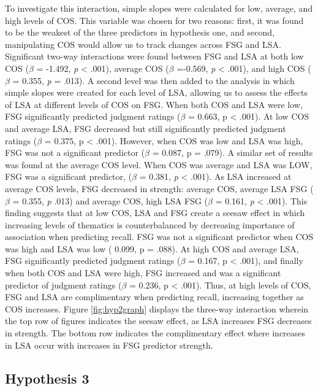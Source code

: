 \documentclass[english,man]{apa6}
\theoremstyle{definition}
\theoremstyle{definition}
\theoremstyle{definition}
\theoremstyle{remark}
\begin{document}
To investigate this interaction, simple slopes were calculated for low,
average, and high levels of COS. This variable was chosen for two
reasons: first, it was found to be the weakest of the three predictors
in hypothesis one, and second, manipulating COS would allow us to track
changes across FSG and LSA. Significant two-way interactions were found
between FSG and LSA at both low COS (\(\beta\) = -1.492, \emph{p}
\textless{} .001), average COS (\(\beta\) =-0.569, \emph{p} \textless{}
.001), and high COS (\(\beta\) = 0.355, \emph{p} = .013). A second level
was then added to the analysis in which simple slopes were created for
each level of LSA, allowing us to assess the effects of LSA at different
levels of COS on FSG. When both COS and LSA were low, FSG significantly
predicted judgment ratings (\(\beta\) = 0.663, p \textless{} .001). At
low COS and average LSA, FSG decreased but still significantly predicted
judgment ratings (\(\beta\) = 0.375, p \textless{} .001). However, when
COS was low and LSA was high, FSG was not a significant predictor
(\(\beta\) = 0.087, p = .079). A similar set of results was found at the
average COS level. When COS was average and LSA was LOW, FSG was a
significant predictor, (\(\beta\) = 0.381, \emph{p} \textless{} .001).
As LSA increased at average COS levels, FSG decreased in strength:
average COS, average LSA FSG (\(\beta\) = 0.355, \emph{p} .013) and
average COS, high LSA FSG (\(\beta\) = 0.161, \emph{p} \textless{}
.001). This finding suggests that at low COS, LSA and FSG create a
seesaw effect in which increasing levels of thematics is counterbalanced
by decreasing importance of association when predicting recall. FSG was
not a significant predictor when COS was high and LSA was low ( 0.099, p
= .088). At high COS and average LSA, FSG significantly predicted
judgment ratings (\(\beta\) = 0.167, p \textless{} .001), and finally
when both COS and LSA were high, FSG increased and was a significant
predictor of judgment ratings (\(\beta\) = 0.236, p \textless{} .001).
Thus, at high levels of COS, FSG and LSA are complimentary when
predicting recall, increasing together as COS increases. Figure
\ref{fig:hyp2graph} displays the three-way interaction wherein the top
row of figures indicates the seesaw effect, as LSA increases FSG
decreases in strength. The bottom row indicates the complimentary effect
where increases in LSA occur with increases in FSG predictor strength.

\subsection{Hypothesis 3}\label{hypothesis-3}
\end{document}
